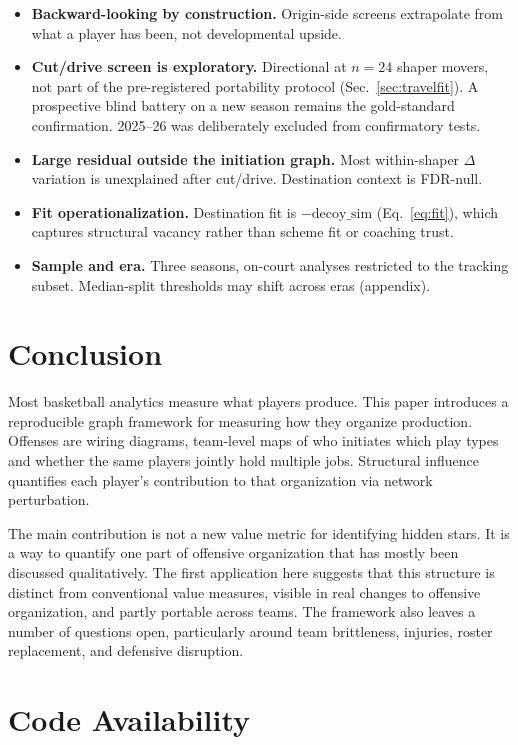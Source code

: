 \documentclass[11pt]{article}
\begin{document}
\begin{itemize}[leftmargin=1.4em,itemsep=0.2em]
 \item \textbf{Backward-looking by construction.} Origin-side screens extrapolate from what a
 player has been, not developmental upside.
 \item \textbf{Cut/drive screen is exploratory.} Directional at $n=24$ shaper movers, not part
 of the pre-registered portability protocol (Sec.~\ref{sec:travelfit}). A prospective blind
 battery on a new season remains the gold-standard confirmation. 2025--26 was deliberately
 excluded from confirmatory tests.
 \item \textbf{Large residual outside the initiation graph.} Most within-shaper $\Delta$
 variation is unexplained after cut/drive. Destination context is FDR-null.
 \item \textbf{Fit operationalization.} Destination fit is $-\text{decoy\_sim}$
 (Eq.~\ref{eq:fit}), which captures structural vacancy rather than scheme fit or coaching
 trust.
 \item \textbf{Sample and era.} Three seasons, on-court analyses restricted to the tracking
 subset. Median-split thresholds may shift across eras (appendix).
\end{itemize}

\section{Conclusion}
\label{sec:conclusion}

Most basketball analytics measure what players produce. This paper introduces a reproducible
graph framework for measuring how they organize production. Offenses are wiring diagrams,
team-level maps of who initiates which play types and whether the same players jointly hold
multiple jobs. Structural influence quantifies each player's contribution to that organization
via network perturbation.

The main contribution is not a new value metric for identifying hidden stars. It is a way to
quantify one part of offensive organization that has mostly been discussed qualitatively. The
first application here suggests that this structure is distinct from conventional value
measures, visible in real changes to offensive organization, and partly portable across teams.
The framework also leaves a number of questions open, particularly around team brittleness,
injuries, roster replacement, and defensive disruption.

\section*{Code Availability}
\end{document}
